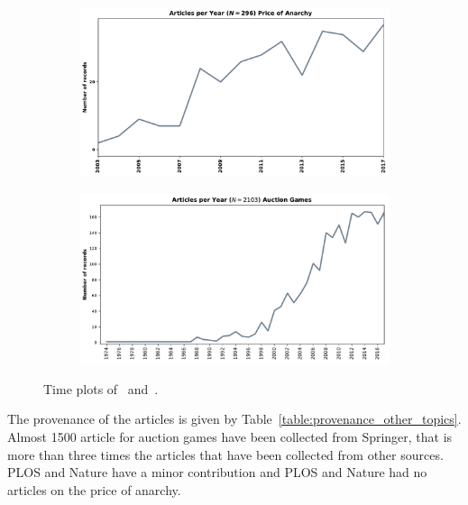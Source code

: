 \documentclass{article}
\begin{document}
\begin{center}
\begin{figure}[!hbtp]
    \begin{subfigure}{0.5\textwidth}
        \includegraphics[width=\textwidth]{./assets/images/anarchy_timeline.pdf}
    \end{subfigure}
    \begin{subfigure}{0.5\textwidth}
        \includegraphics[width=\textwidth]{./assets/images/auction_timeline.pdf}
    \end{subfigure}
\caption{Time plots of~\cite{} and~\cite{}.}
\label{fig:timeplots_other_topics}
\end{figure}
\end{center}

The provenance of the articles is given by Table~\ref{table:provenance_other_topics}.
Almost 1500 article for auction games have been collected from Springer, that is
more than three times the articles that have been collected from other sources.
PLOS and Nature have a minor contribution and PLOS and Nature had no
articles on the price of anarchy.
\end{document}
